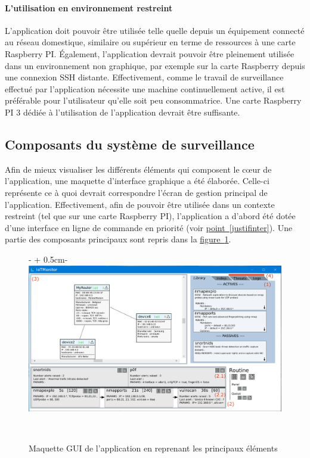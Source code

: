 \documentclass[]{article}
\newcommand{\wordlink}[2]{\hyperref[#1]{#2~\ref{#1}}}
\begin{document}
\paragraph{L'utilisation en environnement restreint}

L'application doit pouvoir être utilisée telle quelle depuis un équipement connecté au réseau domestique, similaire ou supérieur en terme de ressources à une carte Raspberry PI. Également, l'application devrait pouvoir être pleinement utilisée dans un environnement non graphique, par exemple sur la carte Raspberry depuis une connexion SSH distante. Effectivement, comme le travail de surveillance effectué par l'application nécessite une machine continuellement active, il est préférable pour l'utilisateur qu'elle soit peu consommatrice. Une carte Raspberry PI 3 dédiée à l'utilisation de l'application devrait être suffisante.

\newpage

\subsection{Composants du système de surveillance}
\label{compapp}

Afin de mieux visualiser les différents éléments qui composent le cœur de l'application, une maquette d'interface graphique a été élaborée. Celle-ci représente ce à quoi devrait correspondre l'écran de gestion principal de l'application. Effectivement, afin de pouvoir être utilisée dans un contexte restreint (tel que sur une carte Raspberry PI), l'application a d'abord été dotée d'une interface en ligne de commande en priorité (voir \wordlink{justifinter}{point}). Une partie des composants principaux sont repris dans la 
\wordlink{gui}{figure}.

\begin{figure}[!ht]
   \begin{adjustwidth}{-\oddsidemargin-1in + 0.5cm}{-\rightmargin}
     \centering
     \includegraphics[width=\paperwidth - 1cm]{maqGUI}
     \caption{Maquette GUI de l'application en reprenant les principaux éléments}
     \label{gui}
   \end{adjustwidth}
   \
\end{figure}
\end{document}
